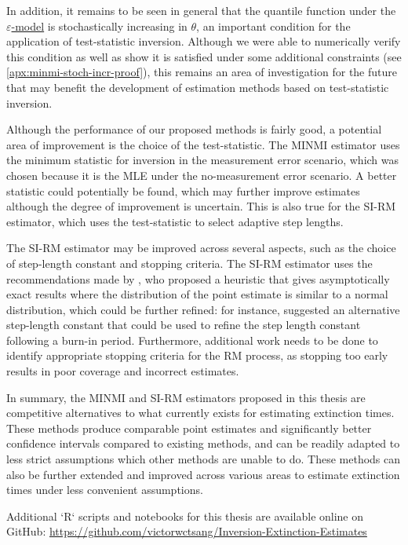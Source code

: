 In addition, it remains to be seen in general that the quantile function under the \hyperref[model: measurement-error]{$\varepsilon$-model} is stochastically increasing in $\theta$, an important condition for the application of test-statistic inversion. Although we were able to numerically verify this condition as well as show it is satisfied under some additional constraints (see \autoref{apx:minmi-stoch-incr-proof}), this remains an area of investigation for the future that may benefit the development of estimation methods based on test-statistic inversion.

Although the performance of our proposed methods is fairly good, a potential area of improvement is the choice of the test-statistic. The MINMI estimator uses the minimum statistic for inversion in the measurement error scenario, which was chosen because it is the MLE under the no-measurement error scenario. A better statistic could potentially be found, which may further improve estimates although the degree of improvement is uncertain. This is also true for the SI-RM estimator, which uses the test-statistic to select adaptive step lengths.

The SI-RM estimator may be improved across several aspects, such as the choice of step-length constant and stopping criteria. The SI-RM estimator uses the recommendations made by \citet{Garthwaite1992}, who proposed a heuristic that gives asymptotically exact results where the distribution of the point estimate is similar to a normal distribution, which could be further refined: for instance, \citet{LlyodBotev2015} suggested an alternative step-length constant that could be used to refine the step length constant following a burn-in period. Furthermore, additional work needs to be done to identify appropriate stopping criteria for the RM process, as stopping too early results in poor coverage and incorrect estimates.

In summary, the MINMI and SI-RM estimators proposed in this thesis are competitive alternatives to what currently exists for estimating extinction times. These methods produce comparable point estimates and significantly better confidence intervals compared to existing methods, and can be readily adapted to less strict assumptions which other methods are unable to do. These methods can also be further extended and improved across various areas to estimate extinction times under less convenient assumptions.

Additional `R` scripts and notebooks for this thesis are available online on GitHub: \url{https://github.com/victorwctsang/Inversion-Extinction-Estimates}